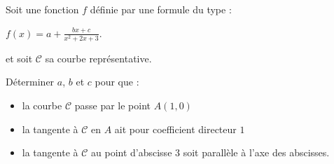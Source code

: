
%
Soit une fonction $f$ définie par une formule du type :

\begin{center}
$f\left(x\right)=a+ \frac{bx+c}{x^{2}+2x+3}$.
\end{center}
et soit $\mathscr C$ sa courbe représentative.
\par
Déterminer $a$, $b$ et $c$ pour que :
\begin{itemize}
     \item
     la courbe $\mathscr C$ passe par le point $A\left(1,0\right)$
     \item
     la tangente à $\mathscr C$ en $A$ ait pour coefficient directeur $1$
     \item
     la tangente à $\mathscr C$ au point d'abscisse $3$ soit parallèle à l'axe des abscisses.
\end{itemize}
